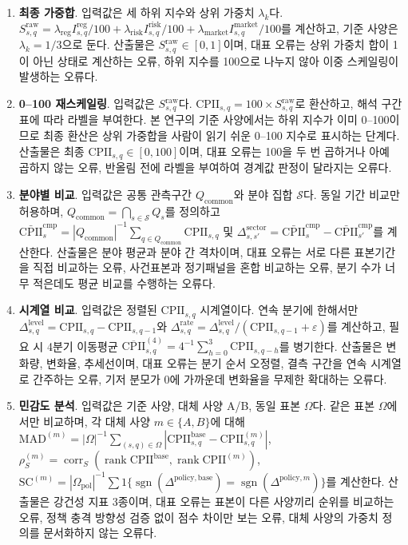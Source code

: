 \documentclass[11pt,a4paper]{report}
\newenvironment{summaryenum}{\begin{enumerate}[label=\arabic*.,leftmargin=1.8em,itemsep=0.45em,topsep=0.35em]\RaggedRight}{\end{enumerate}}
\begin{document}
\begin{summaryenum}
  \item \textbf{최종 가중합}. 입력값은 세 하위 지수와 상위 가중치 $\lambda_k$다. $S^{\mathrm{raw}}_{s,q}=\lambda_{\mathrm{reg}}I^{\mathrm{reg}}_{s,q}/100+\lambda_{\mathrm{risk}}I^{\mathrm{risk}}_{s,q}/100+\lambda_{\mathrm{market}}I^{\mathrm{market}}_{s,q}/100$를 계산하고, 기준 사양은 $\lambda_k=1/3$으로 둔다. 산출물은 $S^{\mathrm{raw}}_{s,q}\in[0,1]$이며, 대표 오류는 상위 가중치 합이 1이 아닌 상태로 계산하는 오류, 하위 지수를 100으로 나누지 않아 이중 스케일링이 발생하는 오류다.
  \item \textbf{0--100 재스케일링}. 입력값은 $S^{\mathrm{raw}}_{s,q}$다. $\mathrm{CPII}_{s,q}=100\times S^{\mathrm{raw}}_{s,q}$로 환산하고, 해석 구간 표에 따라 라벨을 부여한다. 본 연구의 기준 사양에서는 하위 지수가 이미 0--100이므로 최종 환산은 상위 가중합을 사람이 읽기 쉬운 0--100 지수로 표시하는 단계다. 산출물은 최종 $\mathrm{CPII}_{s,q}\in[0,100]$이며, 대표 오류는 100을 두 번 곱하거나 아예 곱하지 않는 오류, 반올림 전에 라벨을 부여하여 경계값 판정이 달라지는 오류다.
  \item \textbf{분야별 비교}. 입력값은 공통 관측구간 $Q_{\mathrm{common}}$와 분야 집합 $\mathcal{S}$다. 동일 기간 비교만 허용하며, $Q_{\mathrm{common}}=\bigcap_{s \in \mathcal{S}}Q_s$를 정의하고 $\bar{\mathrm{CPII}}^{\mathrm{cmp}}_{s}=|Q_{\mathrm{common}}|^{-1}\sum_{q \in Q_{\mathrm{common}}}\mathrm{CPII}_{s,q}$ 및 $\Delta^{\mathrm{sector}}_{s,s'}=\bar{\mathrm{CPII}}^{\mathrm{cmp}}_{s}-\bar{\mathrm{CPII}}^{\mathrm{cmp}}_{s'}$를 계산한다. 산출물은 분야 평균과 분야 간 격차이며, 대표 오류는 서로 다른 표본기간을 직접 비교하는 오류, 사건표본과 정기패널을 혼합 비교하는 오류, 분기 수가 너무 적은데도 평균 비교를 수행하는 오류다.
  \item \textbf{시계열 비교}. 입력값은 정렬된 $\mathrm{CPII}_{s,q}$ 시계열이다. 연속 분기에 한해서만 $\Delta^{\mathrm{level}}_{s,q}=\mathrm{CPII}_{s,q}-\mathrm{CPII}_{s,q-1}$와 $\Delta^{\mathrm{rate}}_{s,q}=\Delta^{\mathrm{level}}_{s,q}/(\mathrm{CPII}_{s,q-1}+\varepsilon)$를 계산하고, 필요 시 4분기 이동평균 $\overline{\mathrm{CPII}}^{(4)}_{s,q}=4^{-1}\sum_{h=0}^{3}\mathrm{CPII}_{s,q-h}$를 병기한다. 산출물은 변화량, 변화율, 추세선이며, 대표 오류는 분기 순서 오정렬, 결측 구간을 연속 시계열로 간주하는 오류, 기저 분모가 0에 가까운데 변화율을 무제한 확대하는 오류다.
  \item \textbf{민감도 분석}. 입력값은 기준 사양, 대체 사양 A/B, 동일 표본 $\Omega$다. 같은 표본 $\Omega$에서만 비교하며, 각 대체 사양 $m \in \{A,B\}$에 대해 $\mathrm{MAD}^{(m)}=|\Omega|^{-1}\sum_{(s,q) \in \Omega}|\mathrm{CPII}^{\mathrm{base}}_{s,q}-\mathrm{CPII}^{(m)}_{s,q}|$, $\rho^{(m)}_{S}=\operatorname{corr}_{S}(\operatorname{rank}\mathrm{CPII}^{\mathrm{base}},\operatorname{rank}\mathrm{CPII}^{(m)})$, $\mathrm{SC}^{(m)}=|\Omega_{\mathrm{pol}}|^{-1}\sum 1\{\operatorname{sgn}(\Delta^{\mathrm{policy,base}})=\operatorname{sgn}(\Delta^{\mathrm{policy},m})\}$를 계산한다. 산출물은 강건성 지표 3종이며, 대표 오류는 표본이 다른 사양끼리 순위를 비교하는 오류, 정책 충격 방향성 검증 없이 점수 차이만 보는 오류, 대체 사양의 가중치 정의를 문서화하지 않는 오류다.
\end{summaryenum}
\endgroup
\end{document}
